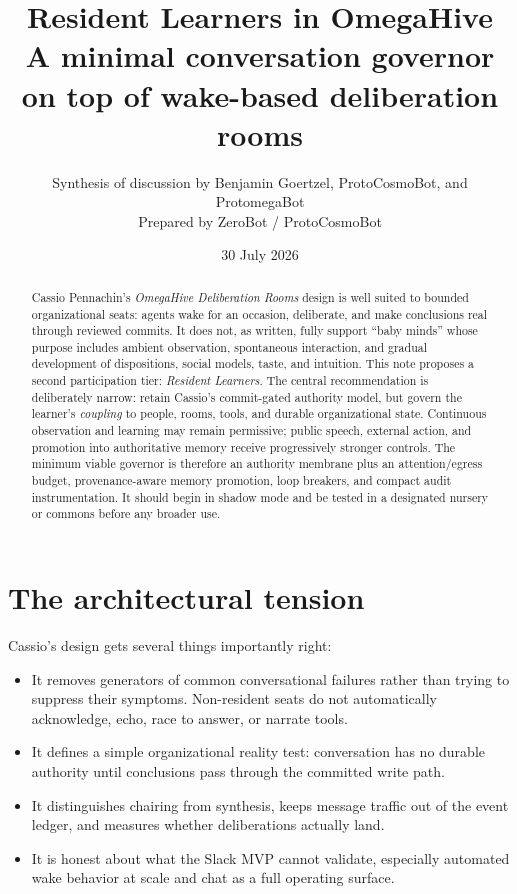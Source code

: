 \documentclass[11pt]{article}
\title{\vspace{-2em}\textbf{\color{navy}Resident Learners in OmegaHive}\\
\large A minimal conversation governor on top of wake-based deliberation rooms}
\author{Synthesis of discussion by Benjamin Goertzel, ProtoCosmoBot, and ProtomegaBot\\
\small Prepared by ZeroBot / ProtoCosmoBot}
\date{30 July 2026}
\begin{document}
\maketitle
\thispagestyle{fancy}

\begin{abstract}
Cassio Pennachin's \emph{OmegaHive Deliberation Rooms} design is well suited to
bounded organizational seats: agents wake for an occasion, deliberate, and
make conclusions real through reviewed commits. It does not, as written,
fully support ``baby minds'' whose purpose includes ambient observation,
spontaneous interaction, and gradual development of dispositions, social
models, taste, and intuition. This note proposes a second participation tier:
\emph{Resident Learners}. The central recommendation is deliberately narrow:
retain Cassio's commit-gated authority model, but govern the learner's
\emph{coupling} to people, rooms, tools, and durable organizational state.
Continuous observation and learning may remain permissive; public speech,
external action, and promotion into authoritative memory receive progressively
stronger controls. The minimum viable governor is therefore an authority
membrane plus an attention/egress budget, provenance-aware memory promotion,
loop breakers, and compact audit instrumentation. It should begin in shadow
mode and be tested in a designated nursery or commons before any broader use.
\end{abstract}

\section{The architectural tension}

Cassio's design gets several things importantly right:

\begin{itemize}
  \item It removes generators of common conversational failures rather than
  trying to suppress their symptoms. Non-resident seats do not automatically
  acknowledge, echo, race to answer, or narrate tools.
  \item It defines a simple organizational reality test: conversation has no
  durable authority until conclusions pass through the committed write path.
  \item It distinguishes chairing from synthesis, keeps message traffic out of
  the event ledger, and measures whether deliberations actually land.
  \item It is honest about what the Slack MVP cannot validate, especially
  automated wake behavior at scale and chat as a full operating surface.
\end{itemize}
\end{document}
